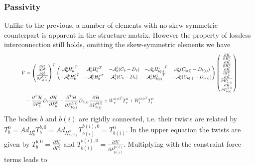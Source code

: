 \documentclass[a4paper,twoside, openright,12pt]{report}
\begin{document}
{\subsubsection{Passivity}
Unlike to the previous, a number of elements with no skew-symmetric counterpart is apparent in the structure matrix. However the property of lossless interconnection still holds, omitting the skew-symmetric elements we have
\begin{eqnarray}
\resizebox{0.9\hsize}{!}{$
\begin{aligned}
\dot{V} &= 
\begin{pmatrix}\frac{\partial \mathcal{H}}{\partial P_b^b} \\ 
\frac{\partial \mathcal{H}}{\partial P_{b(i)}^{b(i)}}
\end{pmatrix}^T
\begin{pmatrix}
\mathcal{A}_b^b {H_b^0}^T & \mathcal{A}_b^b {H_b^v}^T & -\mathcal{A}_b^b(C_b-D_b) & -\mathcal{A}_b^i {H_{b(i)}^i}^T & \mathcal{A}_b^i (C_{b(i)} - D_{b(i)}) \\
-\mathcal{A}_i^b {H_b^0}^T & -\mathcal{A}_i^b {H_b^v}^T & \mathcal{A}_i^b(C_b-D_b)  & \mathcal{A}_i^i {H_{b(i)}^i}^T & -\mathcal{A}_i^i (C_{b(i)} - D_{b(i)})
\end{pmatrix}
\begin{pmatrix}\frac{\partial \mathcal{H}}{\partial H_b^0}\\ \frac{\partial \mathcal{H}}{\partial H_b^v} \\ \frac{\partial \mathcal{H}}{\partial P_b^b} \\ \frac{\partial \mathcal{H}}{\partial H_{b(i)}^i} \\ 
\frac{\partial \mathcal{H}}{\partial P_{b(i)}^{b(i)}}\end{pmatrix}\\
&- \frac{\partial^T \mathcal{H}}{\partial P_b^b} D_b \frac{\partial \mathcal{H}}{\partial P_b^b} - \frac{\partial^T \mathcal{H}}{\partial P_{b(i)}^{b(i)}} D_{b(i)} \frac{\partial \mathcal{H}}{\partial P_{b(i)}^{b(i)}} + {W_v^{0,0}}^T T_v^0 + {W_i^{0,0}}^T T_i^0
\end{aligned}
$}
\end{eqnarray}   
The bodies $b$ and $b(i)$ are rigidly connected, i.e. their twists are related by $T_b^0 = Ad_{H_b^0} T_b^{b,0} = Ad_{H_{b(i)}^0} T_{b(i)}^{b(i),0} = T_{b(i)}^0$. In the upper equation the twists are given by $T_{b}^{b,0} = \frac{\partial \mathcal{H}}{\partial P_{b}^{b}}$ and $T_{b(i)}^{b(i),0} = \frac{\partial \mathcal{H}}{\partial P_{b(i)}^{b(i)}}$. Multiplying with the constraint force terms leads to
}
\end{document}
